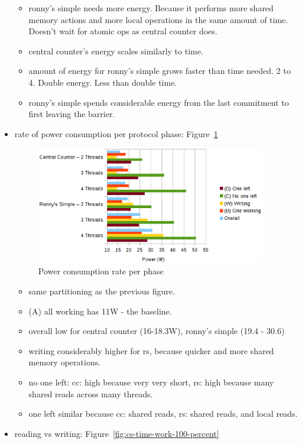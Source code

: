 \documentclass[a4paper, 10pt]{article}
\begin{document}
\begin{itemize}
\begin{itemize}
			\item ronny's simple needs more energy. Because it performs more shared memory actions and more local operations in the same amount of time. Doesn't wait for atomic ops as central counter does.
			\item central counter's energy scales similarly to time.
			\item amount of energy for ronny's simple grows faster than time needed. 2 to 4. Double energy. Less than double time.
			\item ronny's simple spends considerable energy from the last commitment to first leaving the barrier.
		\end{itemize}
	\item rate of power consumption per protocol phase: Figure~\ref{fig:cs-power-work-100}
		\begin{figure}[htbp]
			\centering
			\includegraphics[width=10cm]{charts/cs-power-work-100}
			\caption{Power consumption rate per phase}
			\label{fig:cs-power-work-100}
		\end{figure}
		\begin{itemize}
			\item same partitioning as the previous figure.
			\item (A) all working has 11W - the baseline.
			\item overall low for central counter (16-18.3W), ronny's simple (19.4 - 30.6)
			\item writing considerably higher for rs, because quicker and more shared memory operations.
			\item no one left: cc: high because very very short, rs: high because many shared reads across many threads.
			\item one left similar because cc: shared reads, rs: shared reads, and local reads.
		\end{itemize}
	\item reading vs writing: Figure~\ref{fig:cs-time-work-100-percent}
		\begin{figure}[htbp]

\end{figure}
\end{itemize}
\end{document}
